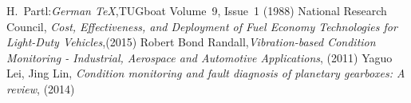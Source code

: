 \documentclass[]{unswthesis}
\begin{document}
\frontmatter  
\maketitle





\tableofcontents
\listoffigures  %
\listoftables  %

\mainmatter








\backmatter


\begin{thebibliography}{99}
  H.~Partl:\emph{German \TeX},TUGboat Volume~9, Issue~1 (1988)
  National Research Council, \textit{Cost, Effectiveness, and Deployment of Fuel Economy Technologies for Light-Duty Vehicles},(2015)
   Robert Bond Randall,\textit{Vibration-based Condition Monitoring - Industrial, Aerospace and Automotive Applications}, (2011) 
   Yaguo Lei, Jing Lin,\textit{ Condition monitoring and fault diagnosis of planetary gearboxes: A review}, (2014) 


 \end{thebibliography}



\end{document}
